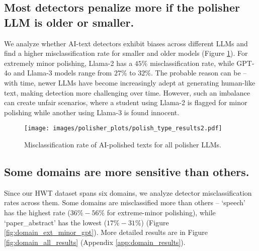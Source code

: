 \subsection{Most detectors penalize more if the polisher LLM is older or smaller.}
We analyze whether AI-text detectors exhibit biases across different LLMs and find a higher misclassification rate for smaller and older models (Figure \ref{fig:polisher_llm}). For extremely minor polishing, Llama-2 has a $45\%$ misclassification rate, while GPT-4o and Llama-3 models range from $27\%$ to $32\%$.
The probable reason can be -- with time, newer LLMs have become increasingly adept at generating human-like text, making detection more challenging over time. 
However, such an imbalance can create unfair scenarios, where a student using Llama-2 is flagged for minor polishing while another using Llama-3 is found innocent.

\begin{figure}
    \centering
    \texttt{[image: images/polisher\_plots/polish\_type\_results2.pdf]}
    \caption{Misclassification rate of AI-polished texts for all polisher LLMs.}
    \label{fig:polisher_llm}
\end{figure}

\subsection{Some domains are more sensitive than others.}
Since our HWT dataset spans six domains, we analyze detector misclassification rates across them. Some domains are misclassified more than others -- `speech' has the highest rate ($36\% - 56\%$ for extreme-minor polishing), while `paper\_abstract' has the lowest ($17\% - 31\%$) (Figure \ref{fig:domain_ext_minor_gpt}). More detailed results are in Figure \ref{fig:domain_all_results} (Appendix \ref{app:domain_results}).


